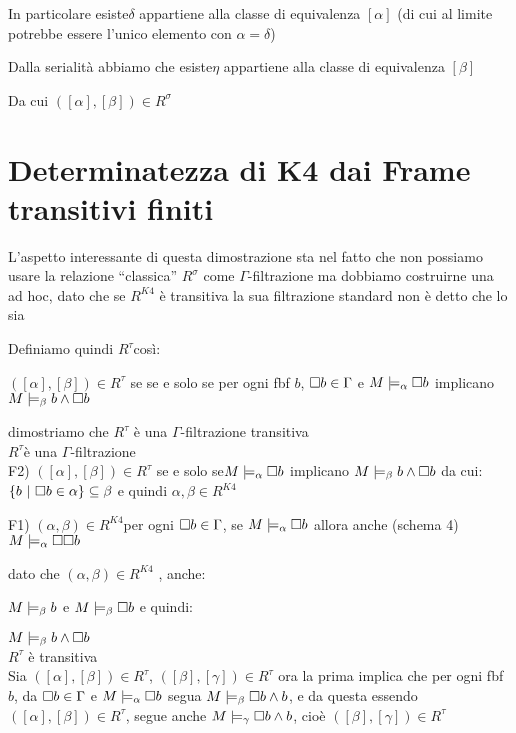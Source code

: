 In particolare esiste$\delta$ appartiene alla classe di equivalenza
$[\alpha]$ (di cui al limite potrebbe essere l'unico elemento con
$\alpha=\delta$)

Dalla serialità abbiamo che esiste$\eta$ appartiene alla classe di
equivalenza $[\beta]$

Da cui $([\alpha],[\beta])\in R^{\sigma}$


\section{Determinatezza di K4 dai Frame transitivi finiti}

L'aspetto interessante di questa dimostrazione sta nel fatto che non
possiamo usare la relazione ``classica'' $R^{\sigma}$ come $\Gamma$-filtrazione
ma dobbiamo costruirne una ad hoc, dato che se $R^{K4}$ è transitiva
la sua filtrazione standard non è detto che lo sia

Definiamo quindi $R^{\tau}$così:

$([\alpha],[\beta])\in R^{\tau}$ se se e solo se per ogni fbf $b$,
$\square b\in\Gamma$ e $M\models_{\alpha}\square b$ implicano $M\models_{\beta}b\wedge\square b$

dimostriamo che $R^{\tau}$ è una $\Gamma$-filtrazione transitiva\\


$R^{\tau}$è una $\Gamma$-filtrazione\\


F2) $([\alpha],[\beta])\in R^{\tau}$ se e solo se$M\models_{\alpha}\square b$
implicano $M\models_{\beta}b\wedge\square b$ da cui: $\{b\ |\ \boxx{b\in\alpha\}\subseteq\beta}$
e quindi $\alpha,\beta\in R^{K4}$

F1) $(\alpha,\beta)\in R^{K4}$per ogni $\square b\in\Gamma$, se $M\models_{\alpha}\square b$
allora anche (schema 4) $M\models_{\alpha}\square\square b$ 

dato che $(\alpha,\beta)\in R^{K4}$ , anche:

$M\models_{\beta}b$ e $M\models_{\beta}\square b$ e quindi:

$M\models_{\beta}b\wedge\square b$\\


$R^{\tau}$ è transitiva\\


Sia $([\alpha],[\beta])\in R^{\tau}$, $([\beta],[\gamma])\in R^{\tau}$
ora la prima implica che per ogni fbf $b$, da $\square b\in\Gamma$
e $M\models_{\alpha}\square b$ segua $M\models_{\beta}\square b\wedge b$,
e da questa essendo $([\alpha],[\beta])\in R^{\tau}$, segue anche
$M\models_{\gamma}\square b\wedge b$, cioè $([\beta],[\gamma])\in R^{\tau}$%

